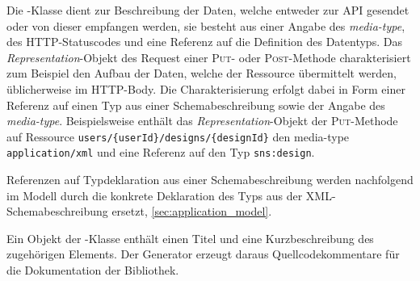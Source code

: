 Die -Klasse dient zur Beschreibung der Daten, welche entweder zur \gls{API} gesendet oder von dieser empfangen werden, sie besteht aus einer Angabe des \emph{media-type}, des \gls{HTTP}-Statuscodes und eine Referenz auf die Definition des Datentyps. Das \emph{Representation}-Objekt des Request einer \textsc{Put}- oder \textsc{Post}-Methode charakterisiert zum Beispiel den Aufbau der Daten, welche der Ressource übermittelt werden, üblicherweise im \gls{HTTP}-Body. Die Charakterisierung erfolgt dabei in Form einer Referenz auf einen Typ aus einer Schemabeschreibung sowie der Angabe des \emph{media-type}. Beispielsweise enthält das \emph{Representation}-Objekt der \textsc{Put}-Methode auf Ressource \texttt{users/\{userId\}/designs/\{designId\}} den media-type \texttt{application/xml} und eine Referenz auf den Typ \texttt{sns:design}. 

Referenzen auf Typdeklaration aus einer Schemabeschreibung werden nachfolgend im Modell durch die konkrete Deklaration des Typs aus der \gls{XML}-Schemabeschreibung ersetzt, \cref{sec:application_model}. 

Ein Objekt der -Klasse enthält einen Titel und eine Kurzbeschreibung des zugehörigen Elements.
Der Generator erzeugt daraus Quellcodekommentare für die Dokumentation der Bibliothek.